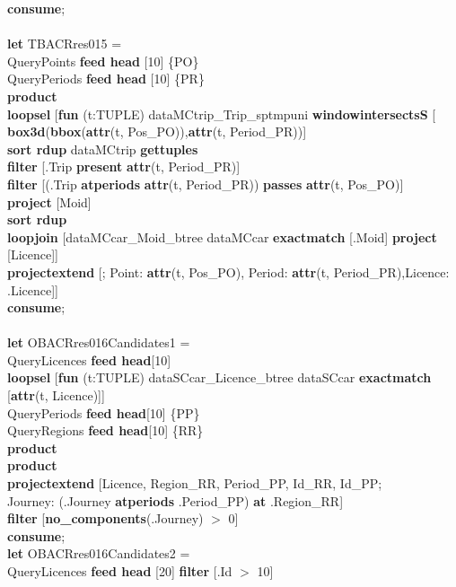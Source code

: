 \documentclass[a4paper]{article}
\newcommand{\op}[1]{\textbf{#1}}
\begin{document}
\begin{scriptsize}
\begin{tabbing}
\op{consume};\\
\\
\op{let} TBACRres015 =\\
\>QueryPoints  \op{feed head} [10] \{PO\}\\
\>QueryPeriods \op{feed head} [10] \{PR\}\\
\>\op{product}\\
\>\op{loopsel} [\op{fun} (t:TUPLE) dataMCtrip\_Trip\_sptmpuni \op{windowintersectsS} [\\ 
\>\>\>\>\op{box3d}(\op{bbox}(\op{attr}(t, Pos\_PO)),\op{attr}(t, Period\_PR))]\\
\>\>\op{sort rdup} dataMCtrip \op{gettuples}\\
\>\>\op{filter} [.Trip \op{present} \op{attr}(t, Period\_PR)]\\
\>\>\op{filter} [(.Trip \op{atperiods} \op{attr}(t, Period\_PR)) \op{passes} \op{attr}(t, Pos\_PO)]\\
\>\>\op{project} [Moid]\\
\>\>\op{sort rdup}\\
\>\>\op{loopjoin} [dataMCcar\_Moid\_btree dataMCcar \op{exactmatch} [.Moid] \op{project} [Licence]]\\
\>\>\op{projectextend} [; Point: \op{attr}(t, Pos\_PO), Period: \op{attr}(t, Period\_PR),Licence: .Licence]]\\
\op{consume};\\
\\
\op{let} OBACRres016Candidates1 =\\
\>QueryLicences \op{feed head}[10]\\
\>\>\>\op{loopsel} [\op{fun} (t:TUPLE) dataSCcar\_Licence\_btree dataSCcar \op{exactmatch} [\op{attr}(t, Licence)]]\\
\>\>QueryPeriods \op{feed head}[10] \{PP\}\\
\>\>QueryRegions \op{feed head}[10] \{RR\}\\
\>\>\op{product}\\
\>\op{product}\\
\>\op{projectextend} [Licence, Region\_RR, Period\_PP, Id\_RR, Id\_PP;\\
\>\>\>Journey: (.Journey \op{atperiods} .Period\_PP) \op{at} .Region\_RR]\\
\>\op{filter} [\op{no\_components}(.Journey) $>$ 0]\\
\op{consume};\\
\op{let} OBACRres016Candidates2 =\\
\>QueryLicences \op{feed head} [20] \op{filter} [.Id $>$ 10]\\

\end{tabbing}
\end{scriptsize}
\end{document}
